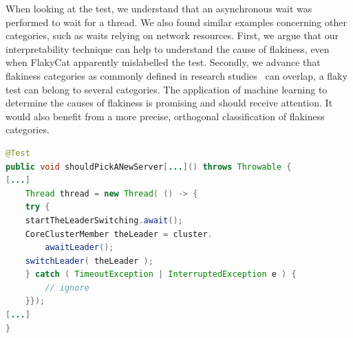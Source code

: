 When looking at the test, we understand that an asynchronous wait was performed to wait for a thread. We also found similar examples concerning other categories, such as waits relying on network resources. First, we argue that our interpretability technique can help to understand the cause of flakiness, even when FlakyCat apparently mislabelled the test. Secondly, we advance that flakiness categories as commonly defined in research studies~\cite{Luo2014, Eck2019} can overlap, \ie a flaky test can belong to several categories. The application of machine learning to determine the causes of flakiness is promising and should receive attention. It would also benefit from a more precise, orthogonal classification of flakiness categories. \\


\begin{lstlisting}[caption={A flaky test belonging to two categories
},label={lst:flaky-example},language=Java]
@Test
public void shouldPickANewServer[...]() throws Throwable {
[...]
    Thread thread = new Thread( () -> {
    try {
    startTheLeaderSwitching.await();
    CoreClusterMember theLeader = cluster.
        awaitLeader();
    switchLeader( theLeader );
    } catch ( TimeoutException | InterruptedException e ) {
        // ignore
    }});
[...]
}
\end{lstlisting}






